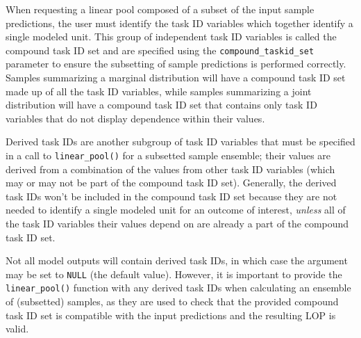 \documentclass[
  letterpaper,
  DIV=11,
  numbers=noendperiod]{scrartcl}
\begin{document}
When requesting a linear pool composed of a subset of the input sample
predictions, the user must identify the task ID variables which together
identify a single modeled unit. This group of independent task ID
variables is called the compound task ID set and are specified using the
\texttt{compound\_taskid\_set} parameter to ensure the subsetting of
sample predictions is performed correctly. Samples summarizing a
marginal distribution will have a compound task ID set made up of all
the task ID variables, while samples summarizing a joint distribution
will have a compound task ID set that contains only task ID variables
that do not display dependence within their values.

Derived task IDs are another subgroup of task ID variables that must be
specified in a call to \texttt{linear\_pool()} for a subsetted sample
ensemble; their values are derived from a combination of the values from
other task ID variables (which may or may not be part of the compound
task ID set). Generally, the derived task IDs won't be included in the
compound task ID set because they are not needed to identify a single
modeled unit for an outcome of interest, \emph{unless} all of the task
ID variables their values depend on are already a part of the compound
task ID set.

Not all model outputs will contain derived task IDs, in which case the
argument may be set to \texttt{NULL} (the default value). However, it is
important to provide the \texttt{linear\_pool()} function with any
derived task IDs when calculating an ensemble of (subsetted) samples, as
they are used to check that the provided compound task ID set is
compatible with the input predictions and the resulting LOP is valid.
\end{document}
